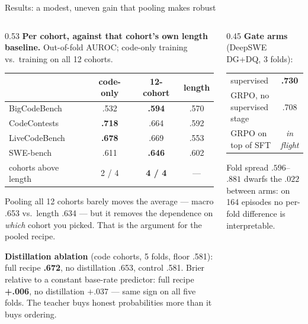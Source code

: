 \documentclass[10pt, aspectratio=169]{beamer}
\newcommand{\g}[1]{\textcolor{accent2}{\textbf{#1}}}
\newcommand{\bad}[1]{\textcolor{warn}{#1}}
\begin{document}
\begin{frame}{Results: a modest, uneven gain that pooling makes robust}
\scriptsize
\begin{columns}[t]
\begin{column}{0.53\textwidth}
\textbf{Per cohort, against that cohort's own length baseline.} Out-of-fold
AUROC; code-only training vs.\ training on all 12 cohorts.
\begin{center}\renewcommand{\arraystretch}{1.05}
\begin{tabular}{lccc}
\toprule
 & code-only & 12-cohort & length \\
\midrule
BigCodeBench  & \bad{.532} & \g{.594} & .570 \\
CodeContests  & \g{.718} & .664 & .592 \\
LiveCodeBench & \g{.678} & .669 & .553 \\
SWE-bench     & \bad{.611} & \g{.646} & .602 \\
\midrule
cohorts above length & 2 / 4 & \g{4 / 4} & --- \\
\bottomrule
\end{tabular}
\end{center}
Pooling all 12 cohorts barely moves the average --- macro .653 vs.\ length
.634 --- but it removes the dependence on \emph{which} cohort you picked. That
is the argument for the pooled recipe.

\medskip
\textbf{Distillation ablation} (code cohorts, 5 folds, floor .581):
full recipe \g{.672}, no distillation .653, control .581. Brier relative to a
constant base-rate predictor: full recipe \g{+.006}, no distillation $+.037$
--- same sign on all five folds. The teacher buys honest probabilities more
than it buys ordering.
\end{column}
\begin{column}{0.45\textwidth}
\textbf{Gate arms} (DeepSWE DG+DQ, 3 folds):
\begin{center}
\begin{tabular}{lc}
\toprule
supervised & \g{.730} \\
GRPO, no supervised stage & .708 \\
GRPO on top of SFT & \emph{in flight} \\
\bottomrule
\end{tabular}
\end{center}
Fold spread $.596$--$.881$ dwarfs the $.022$ between arms: on 164 episodes no
per-fold difference is interpretable.


\end{column}
\end{columns}
\end{frame}
\end{document}
